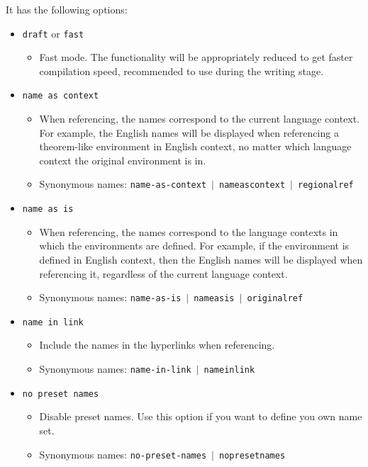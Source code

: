 \documentclass[classical]{einfart}
\newcommand{\packageoption}[1]{\texttt{\textcolor{black!67!green}{#1}}}
\begin{document}
It has the following options:
\begin{itemize}
    \item \packageoption{draft} or \packageoption{fast}
        \begin{itemize}
            \item Fast mode. The functionality will be appropriately reduced to get faster compilation speed, recommended to use during the writing stage.
        \end{itemize}
    \item \packageoption{name as context}
        \begin{itemize}
            \item When referencing, the names correspond to the current language context. For example, the English names will be displayed when referencing a theorem-like environment in English context, no matter which language context the original environment is in.
            \item Synonymous names: \packageoption{name-as-context} \,$|$\, \packageoption{nameascontext} \,$|$\, \packageoption{regionalref}
        \end{itemize}
    \item \packageoption{name as is}
        \begin{itemize}
            \item When referencing, the names correspond to the language contexts in which the environments are defined. For example, if the environment is defined in English context, then the English names will be displayed when referencing it, regardless of the current language context.
            \item Synonymous names: \packageoption{name-as-is} \,$|$\, \packageoption{nameasis} \,$|$\, \packageoption{originalref}
        \end{itemize}
    \item \packageoption{name in link}
        \begin{itemize}
            \item Include the names in the hyperlinks when referencing.
            \item Synonymous names: \packageoption{name-in-link} \,$|$\, \packageoption{nameinlink}
        \end{itemize}
    \item \packageoption{no preset names}
        \begin{itemize}
            \item Disable preset names. Use this option if you want to define you own name set.
            \item Synonymous names: \packageoption{no-preset-names} \,$|$\, \packageoption{nopresetnames}
        \end{itemize}
\end{itemize}
\end{document}
